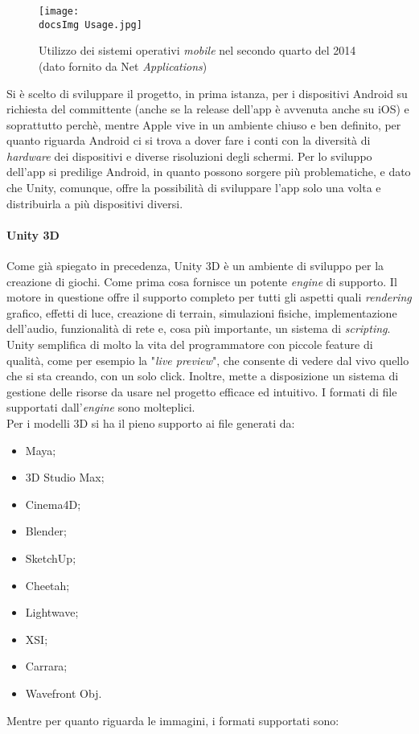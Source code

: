 \begin{figure}[H]
	\centering
	\texttt{[image: \\docsImg Usage.jpg]}
	\caption{Utilizzo dei sistemi operativi \textit{mobile} nel secondo quarto del 2014 (dato fornito da Net \textit{Applications})}
	\label{fig:Utilizzo dei sistemi operativi mobile nel secondo quarto del 2014}
\end{figure}

Si \`e scelto di sviluppare il progetto, in prima istanza, per i dispositivi Android su richiesta del committente (anche se la release dell'app \`e avvenuta anche su iOS) e soprattutto perch\`e, mentre Apple vive in un ambiente chiuso e ben definito, per quanto riguarda Android ci si trova a dover fare i conti con la diversit\`a di \textit{hardware} dei dispositivi e diverse risoluzioni degli schermi. Per lo sviluppo dell'app si predilige Android, in quanto possono sorgere pi\`u problematiche, e dato che Unity, comunque, offre la possibilit\`a di sviluppare l'app solo una volta e distribuirla a pi\`u dispositivi diversi.


\paragraph{Unity 3D}
Come gi\`a spiegato in precedenza, Unity 3D è un ambiente di sviluppo per la creazione di giochi. Come prima cosa fornisce un potente \textit{engine} di supporto. Il motore in questione offre il supporto completo per tutti gli aspetti quali \textit{rendering} grafico, effetti di luce, creazione di terrain, simulazioni fisiche, implementazione dell’audio, funzionalità di rete e, cosa pi\`u importante, un sistema di \textit{scripting}.
Unity semplifica di molto la vita del programmatore con piccole feature di qualit\`a, come per esempio la "\textit{live preview}", che consente di vedere dal vivo quello che si sta creando, con un solo click. Inoltre, mette a disposizione un sistema di gestione delle risorse da usare nel progetto efficace ed intuitivo.
I formati di file supportati dall'\textit{engine} sono molteplici. 
\\Per i modelli 3D si ha il pieno supporto ai file generati da:

\begin{multicols}{3}
\begin{itemize}
	\item Maya;
	\item 3D Studio Max;
	\item Cinema4D;
	\item Blender;
	\item SketchUp;
	\item Cheetah;
	\item Lightwave;
	\item XSI;
	\item Carrara;
	\item Wavefront Obj.
\end{itemize}
\end{multicols}
Mentre per quanto riguarda le immagini, i formati supportati sono:

